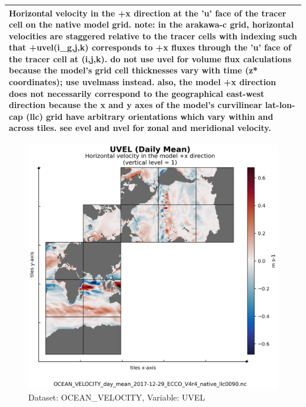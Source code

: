 \begin{longtable}{|m{}|m{}|m{}|m{}|}
\multicolumn{4}{|p{1\textwidth}|}{\footnotesize{{Horizontal velocity in the +x direction at the 'u' face of the tracer cell on the native model grid. note: in the arakawa-c grid, horizontal velocities are staggered relative to the tracer cells with indexing such that +uvel(i\_g,j,k) corresponds to +x fluxes through the 'u' face of the tracer cell at (i,j,k). do not use uvel for volume flux calculations because the model's grid cell thicknesses vary with time (z* coordinates); use uvelmass instead. also, the model +x direction does not necessarily correspond to the geographical east-west direction because the x and y axes of the model's curvilinear lat-lon-cap (llc) grid have arbitrary orientations which vary within and across tiles. see evel and nvel for zonal and meridional velocity.}}} \\ \hline
\end{longtable}

\begin{figure}[H]
\centering
\includegraphics[scale=0.55]{../images/plots/v4r4/native_plots/Ocean_Velocity/UVEL.png}
\caption{Dataset: OCEAN\_VELOCITY, Variable: UVEL}
\label{tab:table-OCEAN_VELOCITY_UVEL-Plot}
\end{figure}
\newpage
\pagebreak
